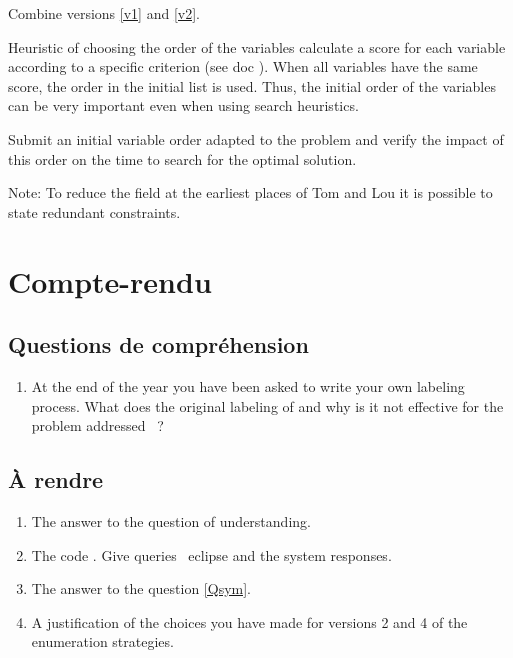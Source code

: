 \begin{version}
Combine versions \ref{v1} and \ref{v2}.
\end{version}

\begin{version}
Heuristic of choosing the order of the variables calculate a score for each variable according to a specific criterion (see doc ).
When all variables have the same score, the order in the initial list is used.
Thus, the initial order of the variables can be very important even when using search heuristics.


Submit an initial variable order adapted to the problem and verify the impact of this order on the time to search for the optimal solution.
\end{version}

Note: To reduce the field at the earliest places of Tom and Lou it is possible to state redundant constraints.

\section{Compte-rendu}

\subsection{Questions de compréhension}

\begin{enumerate}

\item At the end of the year you have been asked to write your own labeling process. What does the original labeling of \eclipse{} and why is it not effective for the problem addressed ~?

\end{enumerate}

\subsection{À rendre}

\begin{enumerate}
\item The answer to the question of understanding.
\item The code \eclipse{}. Give queries \ eclipse {} and the system responses.
\item The answer to the question \ref{Qsym}.
\item A justification of the choices you have made for versions 2 and 4 of the enumeration strategies.
\end{enumerate}

